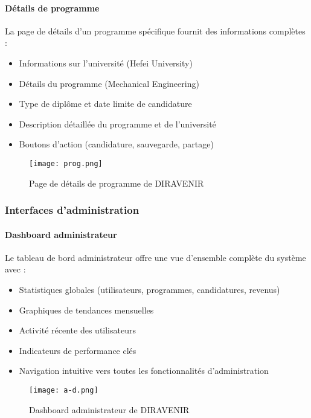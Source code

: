 \documentclass[12pt,a4paper]{report}
\begin{document}
\paragraph{Détails de programme}

La page de détails d'un programme spécifique fournit des informations complètes :

\begin{itemize}
    \item Informations sur l'université (Hefei University)
    \item Détails du programme (Mechanical Engineering)
    \item Type de diplôme et date limite de candidature
    \item Description détaillée du programme et de l'université
    \item Boutons d'action (candidature, sauvegarde, partage)
\end{itemize}

\begin{figure}[H]
\centering
\texttt{[image: prog.png]}
\caption{Page de détails de programme de DIRAVENIR}
\label{fig:program-details}
\end{figure}

\subsubsection{Interfaces d'administration}

\paragraph{Dashboard administrateur}

Le tableau de bord administrateur offre une vue d'ensemble complète du système avec :

\begin{itemize}
    \item Statistiques globales (utilisateurs, programmes, candidatures, revenus)
    \item Graphiques de tendances mensuelles
    \item Activité récente des utilisateurs
    \item Indicateurs de performance clés
    \item Navigation intuitive vers toutes les fonctionnalités d'administration
\end{itemize}

\begin{figure}[H]
\centering
\texttt{[image: a-d.png]}
\caption{Dashboard administrateur de DIRAVENIR}
\label{fig:admin-dashboard}
\end{figure}
\end{document}
